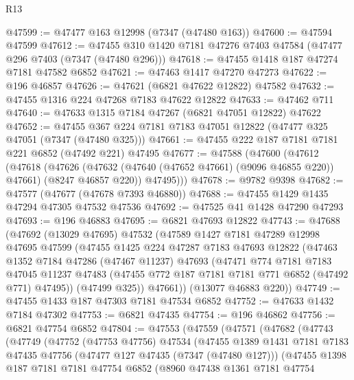 \begin{lexlean}{R13}
\begin{coremodule}
@47599 := @47477 @163 @12998 (@7347 (@47480 @163))
@47600 := @47594 @47599
@47612 := @47455 @310 @1420 @7181 @47276 @7403 @47584 (@47477 @296 @7403 (@7347 (@47480 @296)))
@47618 := @47455 @1418 @187 @47274 @7181 @47582 @6852
@47621 := @47463 @1417 @47270 @47273
@47622 := @196 @46857
@47626 := @47621 (@6821 @47622 @12822) @47582
@47632 := @47455 @1316 @224 @47268 @7183 @47622 @12822
@47633 := @47462 @711
@47640 := @47633 @1315 @7184 @47267 (@6821 @47051 @12822) @47622
@47652 := @47455 @367 @224 @7181 @7183 @47051 @12822 (@47477 @325 @47051 (@7347 (@47480 @325)))
@47661 := @47455 @222 @187 @7181 @7181 @221 @6852 (@47492 @221) @47495
@47677 := @47588
    (@47600
      (@47612
        (@47618
          (@47626 (@47632 (@47640 (@47652 @47661) (@9096 @46855 @220)) @47661) (@8247 @46857 @220))
          @47495)))
@47678 := @9782 @9398
@47682 := @47577 (@47677 (@47678 @7393 @46880))
@47688 := @47455 @1429 @1435 @47294 @47305 @47532 @47536
@47692 := @47525 @41 @1428 @47290 @47293
@47693 := @196 @46883
@47695 := @6821 @47693 @12822
@47743 := @47688
    (@47692
      (@13029 @47695)
      @47532
      (@47589
        @1427
        @7181
        @47289
        @12998
        @47695
        @47599
        (@47455
          @1425
          @224
          @47287
          @7183
          @47693
          @12822
          (@47463
            @1352
            @7184
            @47286
            (@47467 @11237)
            @47693
            (@47471
              @774
              @7181
              @7183
              @47045
              @11237
              @47483
              (@47455 @772 @187 @7181 @7181 @771 @6852 (@47492 @771) @47495))
            (@47499 @325))
          @47661))
      (@13077 @46883 @220))
@47749 := @47455 @1433 @187 @47303 @7181 @47534 @6852
@47752 := @47633 @1432 @7184 @47302
@47753 := @6821 @47435
@47754 := @196 @46862
@47756 := @6821 @47754 @6852
@47804 := @47553
    (@47559
      (@47571
        (@47682
          (@47743
            (@47749
              (@47752
                (@47753 @47756)
                @47534
                (@47455
                  @1389
                  @1431
                  @7181
                  @7183
                  @47435
                  @47756
                  (@47477 @127 @47435 (@7347 (@47480 @127)))
                  (@47455
                    @1398
                    @187
                    @7181
                    @7181
                    @47754
                    @6852
                    (@8960
                      @47438
                      @1361
                      @7181
                      @47754

\end{coremodule}
\end{lexlean}
